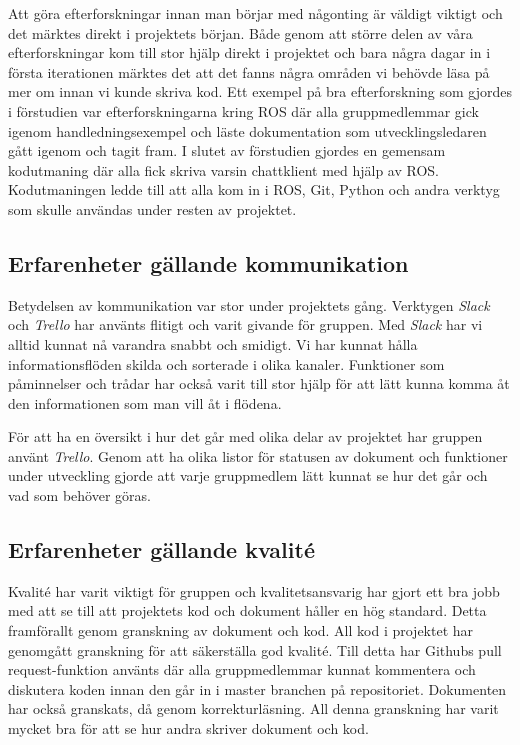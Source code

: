 Att göra efterforskningar innan man börjar med någonting är väldigt viktigt och det märktes direkt i projektets början. Både genom att större delen av våra efterforskningar kom till stor hjälp direkt i projektet och bara några dagar in i första iterationen märktes det att det fanns några områden vi behövde läsa på mer om innan vi kunde skriva kod. Ett exempel på bra efterforskning som gjordes i förstudien var efterforskningarna kring ROS där alla gruppmedlemmar gick igenom handledningsexempel och läste dokumentation som utvecklingsledaren gått igenom och tagit fram. I slutet av förstudien gjordes en gemensam kodutmaning där alla fick skriva varsin chattklient med hjälp av ROS. Kodutmaningen ledde till att alla kom in i ROS, Git, Python och andra verktyg som skulle användas under resten av projektet.


\subsection{Erfarenheter gällande kommunikation}

Betydelsen av kommunikation var stor under projektets gång. Verktygen \textit{Slack} och \textit{Trello} har använts flitigt och varit givande för gruppen. Med \textit{Slack} har vi alltid kunnat nå varandra snabbt och smidigt. Vi har kunnat hålla informationsflöden skilda och sorterade i olika kanaler. Funktioner som påminnelser och trådar har också varit till stor hjälp för att lätt kunna komma åt den informationen som man vill åt i flödena.

För att ha en översikt i hur det går med olika delar av projektet har gruppen använt \textit{Trello}. Genom att ha olika listor för statusen av dokument och funktioner under utveckling gjorde att varje gruppmedlem lätt kunnat se hur det går och vad som behöver göras.


\subsection{Erfarenheter gällande kvalité}

Kvalité har varit viktigt för gruppen och kvalitetsansvarig har gjort ett bra jobb med att se till att projektets kod och dokument håller en hög standard. Detta framförallt genom granskning av dokument och kod. All kod i projektet har genomgått granskning för att säkerställa god kvalité. Till detta har Githubs pull request-funktion använts där alla gruppmedlemmar kunnat kommentera och diskutera koden innan den går in i master branchen på repositoriet. Dokumenten har också granskats, då genom korrekturläsning. All denna granskning har varit mycket bra för att se hur andra skriver dokument och kod.



